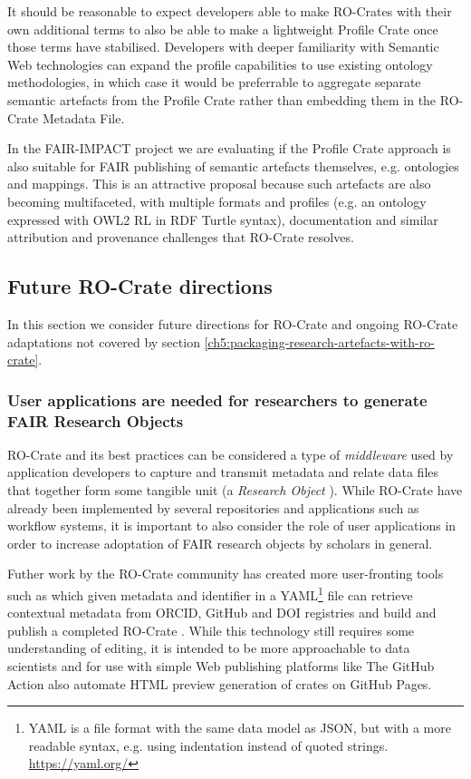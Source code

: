 It should be reasonable to expect developers able to make RO-Crates with their own additional terms to also be able to make a lightweight Profile Crate once those terms have stabilised. Developers with deeper familiarity with Semantic Web technologies can expand the profile capabilities to use existing ontology methodologies, in which case it would be preferrable to aggregate separate semantic artefacts from the Profile Crate rather than embedding them in the RO-Crate Metadata File.

In the FAIR-IMPACT project we are evaluating if the Profile Crate approach is also suitable for FAIR publishing of semantic artefacts themselves, e.g. ontologies and mappings. This is an attractive proposal because such artefacts are also becoming multifaceted, with multiple formats and profiles (e.g. an ontology expressed with OWL2 RL in RDF Turtle syntax), documentation and similar attribution and provenance challenges that RO-Crate resolves.

\subsection{Future RO-Crate directions}
\label{ch61:rocratefuture}
In this section we consider future directions for RO-Crate and ongoing RO-Crate adaptations not covered by section \ref{ch5:packaging-research-artefacts-with-ro-crate}.


\subsubsection{User applications are needed for researchers to generate FAIR Research Objects}
\label{ch61:applications}

RO-Crate and its best practices can be considered a type of \emph{middleware} used by application developers to capture and transmit metadata and relate data files that together form some tangible unit (a \emph{Research Object} \cite{Bechhofer 2013}). While RO-Crate have already been implemented by several repositories and applications such as workflow systems, it is important to also consider the role of user applications in order to increase adoptation of FAIR research objects by scholars in general.

Futher work by the RO-Crate community has created more user-fronting tools such as  which given metadata and identifier in a YAML\footnote{
  YAML is a file format with the same data model as JSON, but with a more readable syntax, e.g. using indentation instead of quoted strings.  \url{https://yaml.org/}} 
file can retrieve contextual metadata from ORCID, GitHub and DOI registries and build and publish a completed RO-Crate \cite{ya2ro}.   
While this technology still requires some understanding of editing, it is intended to be more approachable to data scientists and for use with simple Web publishing platforms like  The GitHub Action  also automate HTML preview generation of crates on GitHub Pages.

